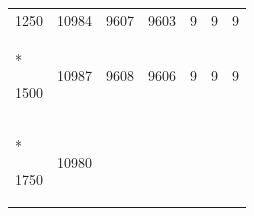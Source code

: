 \documentclass[
  12pt,
  oneside,
  openany]{book}
\begin{document}
\begin{appendices}
\begin{singlespace}
\begin{longtable}[]{@{}lllllll@{}}
\begin{minipage}[t]{0.15\columnwidth}\raggedright
1250\strut
\end{minipage} & \begin{minipage}[t]{0.08\columnwidth}\raggedright
10984\strut
\end{minipage} & \begin{minipage}[t]{0.07\columnwidth}\raggedright
9607\strut
\end{minipage} & \begin{minipage}[t]{0.08\columnwidth}\raggedright
9603\strut
\end{minipage} & \begin{minipage}[t]{0.17\columnwidth}\raggedright
9\strut
\end{minipage} & \begin{minipage}[t]{0.14\columnwidth}\raggedright
9\strut
\end{minipage} & \begin{minipage}[t]{0.12\columnwidth}\raggedright
9\strut
\end{minipage}\tabularnewline*
\begin{minipage}[t]{0.15\columnwidth}\raggedright
1500\strut
\end{minipage} & \begin{minipage}[t]{0.08\columnwidth}\raggedright
10987\strut
\end{minipage} & \begin{minipage}[t]{0.07\columnwidth}\raggedright
9608\strut
\end{minipage} & \begin{minipage}[t]{0.08\columnwidth}\raggedright
9606\strut
\end{minipage} & \begin{minipage}[t]{0.17\columnwidth}\raggedright
9\strut
\end{minipage} & \begin{minipage}[t]{0.14\columnwidth}\raggedright
9\strut
\end{minipage} & \begin{minipage}[t]{0.12\columnwidth}\raggedright
9\strut
\end{minipage}\tabularnewline*
\begin{minipage}[t]{0.15\columnwidth}\raggedright
1750\strut
\end{minipage} & \begin{minipage}[t]{0.08\columnwidth}\raggedright
10980\strut
\end{minipage} & \begin{minipage}[t]{0.07\columnwidth}\raggedright

\end{minipage}
\end{longtable}
\end{singlespace}
\end{appendices}
\end{document}
